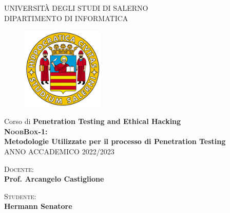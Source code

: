 \documentclass[a4paper, 12pt, oneside]{article}
\begin{document}
\begin{titlepage}
    \begin{center}
        \LARGE{\uppercase{Università degli Studi di Salerno}}\\
        \vspace{5mm}
    	\uppercase{\normalsize Dipartimento di Informatica }\\
    \end{center}
    \begin{figure}[H]
        \centering
        \includegraphics[width=0.35\textwidth]{logo_unisa}
    \end{figure}
    
    \begin{center}
        \normalsize{Corso di \textbf{Penetration Testing and Ethical Hacking}}\\
    	\vspace{10mm}
    	\LARGE{\textbf{\textsc{NoobBox-1}:\\ Metodologie Utilizzate per il processo di Penetration Testing}}\\
    	\vspace{3mm}
        \large{\uppercase{Anno Accademico 2022/2023}}
    \end{center}

    \vspace{55mm}
    \noindent
    \begin{minipage}[t]{0.6\textwidth}
    	\textsc{Docente}:\\\textbf{Prof. Arcangelo Castiglione}
    	\vspace{10mm}\\
    \end{minipage}
    \hfill
    \begin{minipage}[t]{0.4\textwidth}\raggedleft
    	\textsc{Studente}: \\\textbf{Hermann Senatore}
    \end{minipage}
\end{titlepage}

\tableofcontents
\newpage
\end{document}
